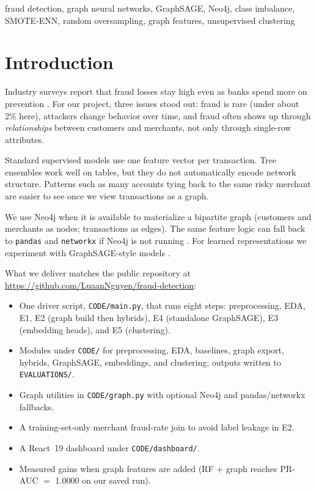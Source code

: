 \documentclass[conference]{IEEEtran}
\begin{document}
\begin{IEEEkeywords}
fraud detection, graph neural networks, GraphSAGE, Neo4j, class imbalance, SMOTE-ENN, random oversampling, graph features, unsupervised clustering
\end{IEEEkeywords}

\section{Introduction}

Industry surveys report that fraud losses stay high even as banks spend more on prevention \cite{b3}. For our project, three issues stood out: fraud is rare (under about 2\% here), attackers change behavior over time, and fraud often shows up through \textit{relationships} between customers and merchants, not only through single-row attributes.

Standard supervised models use one feature vector per transaction. Tree ensembles work well on tables, but they do not automatically encode network structure. Patterns such as many accounts tying back to the same risky merchant are easier to see once we view transactions as a graph.

We use Neo4j when it is available to materialize a bipartite graph (customers and merchants as nodes; transactions as edges). The same feature logic can fall back to \texttt{pandas} and \texttt{networkx} if Neo4j is not running \cite{b2}. For learned representations we experiment with GraphSAGE-style models \cite{b6}.

What we deliver matches the public repository at \url{https://github.com/LuaanNguyen/fraud-detection}:
\begin{itemize}
    \item One driver script, \texttt{CODE/main.py}, that runs eight steps: preprocessing, EDA, E1, E2 (graph build then hybrids), E4 (standalone GraphSAGE), E3 (embedding heads), and E5 (clustering).
    \item Modules under \texttt{CODE/} for preprocessing, EDA, baselines, graph export, hybrids, GraphSAGE, embeddings, and clustering; outputs written to \texttt{EVALUATIONS/}.
    \item Graph utilities in \texttt{CODE/graph.py} with optional Neo4j and pandas/networkx fallbacks.
    \item A training-set-only merchant fraud-rate join to avoid label leakage in E2.
    \item A React~19 dashboard under \texttt{CODE/dashboard/}.
    \item Measured gains when graph features are added (RF + graph reaches PR-AUC $=$ 1.0000 on our saved run).
\end{itemize}
\end{document}
